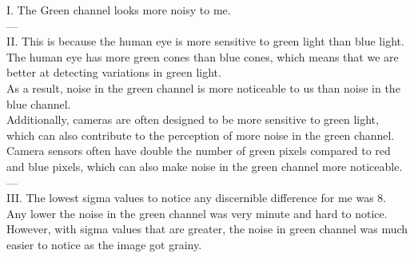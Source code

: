 I. The Green channel looks more noisy to me.\\

---\\

II. This is because the human eye is more sensitive to green light than blue light. \\
The human eye has more green cones than blue cones, which means that we are better at detecting variations in green light. \\
As a result, noise in the green channel is more noticeable to us than noise in the blue channel.\\
Additionally, cameras are often designed to be more sensitive to green light, which can also contribute to the perception of more noise in the green channel.\\
Camera sensors often have double the number of green pixels compared to red and blue pixels, which can also make noise in the green channel more noticeable.\\

---\\

III. The lowest sigma values to notice any discernible difference for me was 8. \\
Any lower the noise in the green channel was very minute and hard to notice. \\
However, with sigma values that are greater, the noise in green channel was much easier to notice as the image got grainy.\\